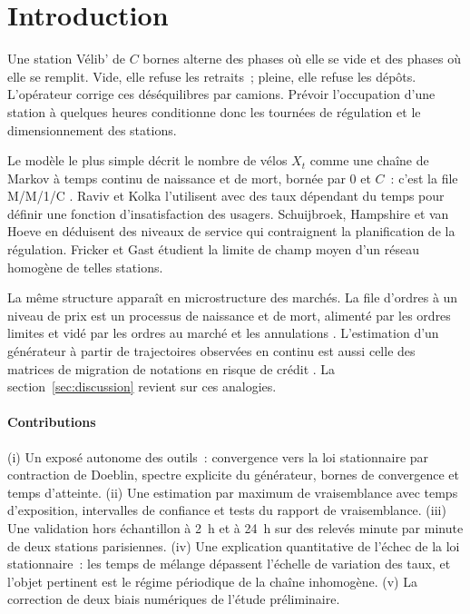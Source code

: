 \documentclass[10pt,a4paper,twocolumn]{article}
\theoremstyle{enonce}
\theoremstyle{defi}
\begin{document}
\section{Introduction}\label{sec:intro}

Une station Vélib' de $C$ bornes alterne des phases où elle se vide et des phases où elle se remplit. Vide, elle refuse les retraits~; pleine, elle refuse les dépôts. L'opérateur corrige ces déséquilibres par camions. Prévoir l'occupation d'une station à quelques heures conditionne donc les tournées de régulation et le dimensionnement des stations.

Le modèle le plus simple décrit le nombre de vélos $X_t$ comme une chaîne de Markov à temps continu de naissance et de mort, bornée par $0$ et $C$~: c'est la file M/M/1/C \cite{STGH18}. Raviv et Kolka \cite{RK13} l'utilisent avec des taux dépendant du temps pour définir une fonction d'insatisfaction des usagers. Schuijbroek, Hampshire et van Hoeve \cite{SHH17} en déduisent des niveaux de service qui contraignent la planification de la régulation. Fricker et Gast \cite{FG16} étudient la limite de champ moyen d'un réseau homogène de telles stations.

La même structure apparaît en microstructure des marchés. La file d'ordres à un niveau de prix est un processus de naissance et de mort, alimenté par les ordres limites et vidé par les ordres au marché et les annulations \cite{CST10,CdL13,HLR15}. L'estimation d'un générateur à partir de trajectoires observées en continu est aussi celle des matrices de migration de notations en risque de crédit \cite{JLT97,LS02}. La section~\ref{sec:discussion} revient sur ces analogies.

\paragraph{Contributions} (i) Un exposé autonome des outils~: convergence vers la loi stationnaire par contraction de Doeblin, spectre explicite du générateur, bornes de convergence et temps d'atteinte. (ii) Une estimation par maximum de vraisemblance avec temps d'exposition, intervalles de confiance et tests du rapport de vraisemblance. (iii) Une validation hors échantillon à 2~h et à 24~h sur des relevés minute par minute de deux stations parisiennes. (iv) Une explication quantitative de l'échec de la loi stationnaire~: les temps de mélange dépassent l'échelle de variation des taux, et l'objet pertinent est le régime périodique de la chaîne inhomogène. (v) La correction de deux biais numériques de l'étude préliminaire.
\end{document}
